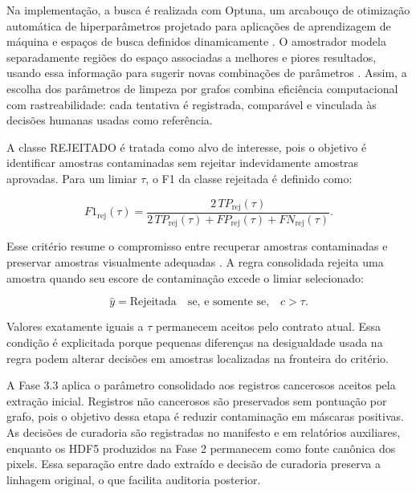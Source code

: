 Na implementação, a busca é realizada com Optuna, um arcabouço de otimização
automática de hiperparâmetros projetado para aplicações de aprendizagem de
máquina e espaços de busca definidos dinamicamente \cite{akiba2019optuna}. O
amostrador  modela separadamente
regiões do espaço associadas a melhores e piores resultados, usando essa
informação para sugerir novas combinações de parâmetros
\cite{bergstra2011algorithms}. Assim, a escolha dos parâmetros de limpeza por
grafos combina eficiência computacional com rastreabilidade: cada tentativa é
registrada, comparável e vinculada às decisões humanas usadas como referência.

A classe REJEITADO é tratada como alvo de interesse, pois o objetivo é identificar
amostras contaminadas sem rejeitar indevidamente amostras aprovadas. Para um
limiar $\tau$, o F1 da classe rejeitada é definido como:

\begin{equation}
    F1_{\mathrm{rej}}(\tau) =
    \frac{
    2\,TP_{\mathrm{rej}}(\tau)
    }{
    2\,TP_{\mathrm{rej}}(\tau)
    + FP_{\mathrm{rej}}(\tau)
    + FN_{\mathrm{rej}}(\tau)
    } .
    \label{eq:f1_rejeitada}
\end{equation}

Esse critério resume o compromisso entre recuperar amostras contaminadas e
preservar amostras visualmente adequadas \cite{sokolova2009performance}. A regra
consolidada rejeita uma amostra quando seu escore de contaminação excede o
limiar selecionado:

\begin{equation}
    \hat{y}=\mathrm{Rejeitada}
    \quad \text{se, e somente se,} \quad
    c>\tau .
    \label{eq:regra_rejeicao}
\end{equation}

Valores exatamente iguais a $\tau$ permanecem aceitos pelo contrato atual. Essa
condição é explicitada porque pequenas diferenças na desigualdade usada na regra
podem alterar decisões em amostras localizadas na fronteira do critério.

A Fase 3.3 aplica o parâmetro consolidado aos registros cancerosos aceitos pela
extração inicial. Registros não cancerosos são preservados sem pontuação por
grafo, pois o objetivo dessa etapa é reduzir contaminação em máscaras positivas.
As decisões de curadoria são registradas no manifesto e em relatórios
auxiliares, enquanto os HDF5 produzidos na Fase 2 permanecem como fonte canônica
dos pixels. Essa separação entre dado extraído e decisão de curadoria preserva a
linhagem original, o que facilita auditoria posterior.

